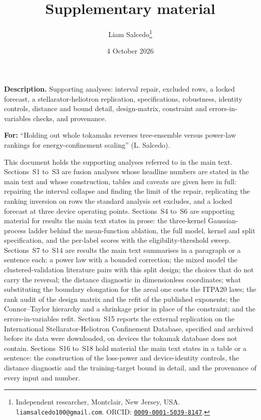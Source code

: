 \documentclass[12pt,letterpaper]{article}
\title{\vspace{-1.4cm}\textbf{Supplementary material}}
\author{Liam Salcedo\thanks{Independent researcher, Montclair, New Jersey, USA.
\texttt{liamsalcedo100@gmail.com}.
ORCID: \href{https://orcid.org/0009-0001-5039-8147}{\texttt{0009-0001-5039-8147}}.}}
\date{4 October 2026}
\begin{document}
\maketitle

\begin{center}\small
\textbf{Description.} Supporting analyses: interval repair, excluded rows, a
locked forecast, a stellarator-heliotron replication,
specifications, robustness, identity controls, distance and bound detail,
design-matrix, constraint and errors-in-variables checks, and provenance.
\end{center}

\vspace{0.4em}
\noindent\textbf{For:} ``Holding out whole tokamaks reverses tree-ensemble
versus power-law rankings for energy-confinement scaling'' (L. Salcedo).

\vspace{0.6em}
\noindent This document holds the supporting analyses referred to in the main
text. Sections~S1 to~S3 are fusion analyses whose headline numbers are stated in
the main text and whose construction, tables and caveats are given here in full:
repairing the interval collapse and finding the limit of the repair, replicating
the ranking inversion on rows the standard analysis set excludes, and a locked
forecast at three device operating points. Sections~S4 to~S6 are supporting material for
results the main text states in prose: the three-kernel Gaussian-process ladder
behind the mean-function ablation, the full model, kernel and split
specification, and the per-label scores with the eligibility-threshold sweep.
Sections~S7 to~S14 are results the main text summarises in a paragraph or a
sentence each: a power law with a bounded correction; the mixed model the
clustered-validation literature pairs with this split design; the choices that
do not carry the reversal; the distance diagnostic in dimensionless
coordinates; what substituting the boundary elongation for the areal one costs
the ITPA20 laws; the rank audit of the design matrix and the refit of the
published exponents; the Connor--Taylor hierarchy and a shrinkage prior in
place of the constraint; and the errors-in-variables refit.
Section~S15 reports the external replication on the International
Stellarator-Heliotron Confinement Database, specified and archived before its
data were downloaded, on devices the tokamak database does not contain.
Sections~S16 to~S18 hold material the main text states in a table or a
sentence: the construction of the loss-power and device-identity controls, the
distance diagnostic and the training-target bound in detail, and the provenance
of every input and number.
\end{document}
